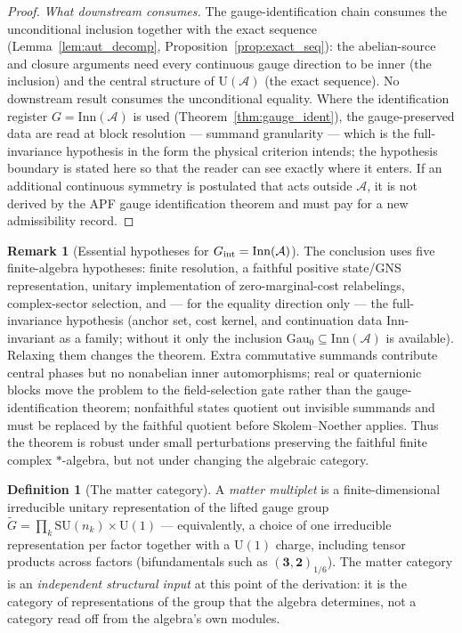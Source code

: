 \documentclass[11pt]{article}
\theoremstyle{definition}
\newtheorem{definition}[theorem]{Definition}
\newtheorem{remark}[theorem]{Remark}
\newcommand{\SU}{\mathrm{SU}}
\newcommand{\U}{\mathrm{U}}
\begin{document}
\begin{proof}
\textit{What downstream consumes.}\quad
The gauge-identification chain consumes the unconditional inclusion
together with the exact sequence (Lemma~\ref{lem:aut_decomp},
Proposition~\ref{prop:exact_seq}): the abelian-source and closure
arguments need every continuous gauge direction to be inner (the
inclusion) and the central structure of $\mathrm{U}(\mathcal A)$ (the
exact sequence).  No downstream result consumes the unconditional
equality.  Where the identification register $G =
\mathrm{Inn}(\mathcal A)$ is used (Theorem~\ref{thm:gauge_ident}), the
gauge-preserved data are read at block resolution --- summand
granularity --- which is the full-invariance hypothesis in the form the
physical criterion intends; the hypothesis boundary is stated here so
that the reader can see exactly where it enters.  If an additional
continuous symmetry is postulated that acts outside $\mathcal A$, it is
not derived by the APF gauge identification theorem and must pay for a
new admissibility record.
\end{proof}

\begin{remark}[Essential hypotheses for $G_{\rm int}=\mathrm{Inn}(\mathcal A)$]
\label{rem:inn_conditions_v35}
The conclusion uses five finite-algebra hypotheses: finite resolution, a faithful positive state/GNS representation, unitary implementation of zero-marginal-cost relabelings, complex-sector selection, and --- for the equality direction only --- the full-invariance hypothesis (anchor set, cost kernel, and continuation data $\mathrm{Inn}$-invariant as a family; without it only the inclusion $\mathrm{Gau}_0 \subseteq \mathrm{Inn}(\mathcal A)$ is available).  Relaxing them changes the theorem.  Extra commutative summands contribute central phases but no nonabelian inner automorphisms; real or quaternionic blocks move the problem to the field-selection gate rather than the gauge-identification theorem; nonfaithful states quotient out invisible summands and must be replaced by the faithful quotient before Skolem--Noether applies.  Thus the theorem is robust under small perturbations preserving the faithful finite complex $*$-algebra, but not under changing the algebraic category.
\end{remark}

\begin{definition}[The matter category]\label{def:matter_category}
A \emph{matter multiplet} is a finite-dimensional irreducible unitary
representation of the lifted gauge group
$\widetilde{G} = \prod_k \SU(n_k) \times \U(1)$ --- equivalently, a
choice of one irreducible representation per factor together with a
$\U(1)$ charge, including tensor products across factors
(bifundamentals such as $(\mathbf{3}, \mathbf{2})_{1/6}$).  The matter
category is an \emph{independent structural input} at this point of
the derivation: it is the category of representations of the group
that the algebra determines, not a category read off from the algebra's
own modules.
\end{definition}
\end{document}
